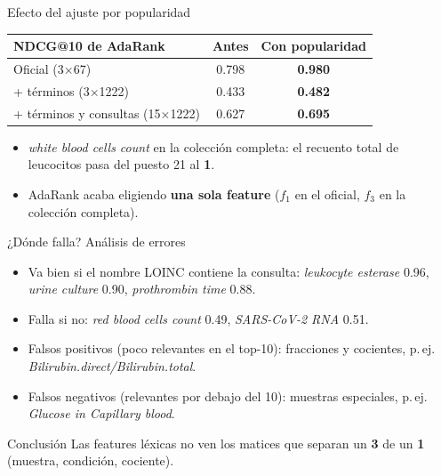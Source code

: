 \documentclass{beamer}
\newcommand{\rel}[1]{\textbf{#1}}
\begin{document}
\begin{frame}{Efecto del ajuste por popularidad}
    \centering\small
    \begin{tabular}{lcc}
        \toprule
        NDCG@10 de AdaRank & Antes & Con popularidad \\
        \midrule
        Oficial (3$\times$67) & 0.798 & \textbf{0.980} \\
        + términos (3$\times$1222) & 0.433 & \textbf{0.482} \\
        + términos y consultas (15$\times$1222) & 0.627 & \textbf{0.695} \\
        \bottomrule
    \end{tabular}
    \vspace{8pt}
    \begin{itemize}\small
        \item \emph{white blood cells count} en la colección completa: el recuento total de leucocitos pasa del puesto 21 al \textbf{1}.
        \item AdaRank acaba eligiendo \textbf{una sola feature} ($f_1$ en el oficial, $f_3$ en la colección completa).
    \end{itemize}

\end{frame}

\begin{frame}{¿Dónde falla? Análisis de errores}
    \begin{itemize}\small
        \item Va bien si el nombre LOINC contiene la consulta: \emph{leukocyte esterase} 0.96, \emph{urine culture} 0.90, \emph{prothrombin time} 0.88.
        \item Falla si no: \emph{red blood cells count} 0.49, \emph{SARS-CoV-2 RNA} 0.51.
        \item Falsos positivos (poco relevantes en el top-10): fracciones y cocientes, p.\,ej. \emph{Bilirubin.direct/Bilirubin.total}.
        \item Falsos negativos (relevantes por debajo del 10): muestras especiales, p.\,ej. \emph{Glucose in Capillary blood}.
    \end{itemize}
    \begin{block}{Conclusión}
        \small Las features léxicas no ven los matices que separan un \rel{3} de un \rel{1} (muestra, condición, cociente).
    \end{block}

\end{frame}
\end{document}
